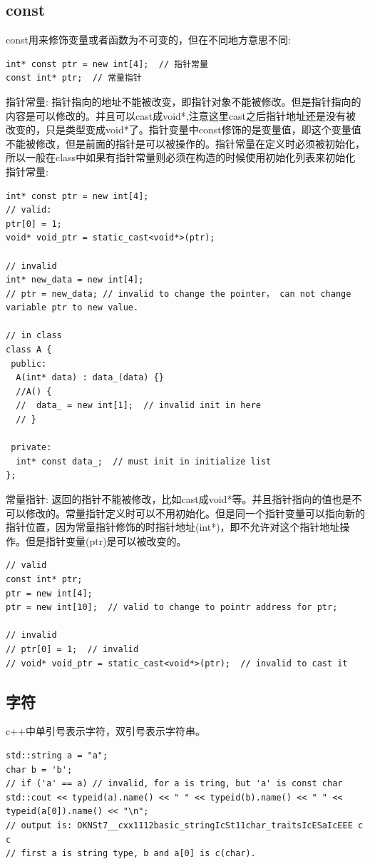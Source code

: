\documentclass[12pt]{book}
\begin{document}
\subsection{const}
const用来修饰变量或者函数为不可变的，但在不同地方意思不同:
\begin{lstlisting}
int* const ptr = new int[4];  // 指针常量
const int* ptr;  // 常量指针
\end{lstlisting}
指针常量: 指针指向的地址不能被改变，即指针对象不能被修改。但是指针指向的内容是可以修改的。并且可以cast成void*,注意这里cast之后指针地址还是没有被改变的，只是类型变成void*了。指针变量中const修饰的是变量值，即这个变量值不能被修改，但是前面的指针是可以被操作的。指针常量在定义时必须被初始化，所以一般在class中如果有指针常量则必须在构造的时候使用初始化列表来初始化指针常量:
\begin{lstlisting}
int* const ptr = new int[4];
// valid:
ptr[0] = 1;
void* void_ptr = static_cast<void*>(ptr);

// invalid
int* new_data = new int[4];
// ptr = new_data; // invalid to change the pointer， can not change variable ptr to new value.

// in class
class A {
 public:
  A(int* data) : data_(data) {}
  //A() {
  //  data_ = new int[1];  // invalid init in here
  // }
	
 private:
  int* const data_;  // must init in initialize list 
};
\end{lstlisting}
常量指针: 返回的指针不能被修改，比如cast成void*等。并且指针指向的值也是不可以修改的。常量指针定义时可以不用初始化。但是同一个指针变量可以指向新的指针位置，因为常量指针修饰的时指针地址(int*)，即不允许对这个指针地址操作。但是指针变量(ptr)是可以被改变的。
\begin{lstlisting}
// valid
const int* ptr;
ptr = new int[4];
ptr = new int[10];  // valid to change to pointr address for ptr;

// invalid
// ptr[0] = 1;  // invalid
// void* void_ptr = static_cast<void*>(ptr);  // invalid to cast it
\end{lstlisting}

\subsection{字符}
c++中单引号表示字符，双引号表示字符串。

\begin{lstlisting}
std::string a = "a";
char b = 'b';
// if ('a' == a) // invalid, for a is tring, but 'a' is const char
std::cout << typeid(a).name() << " " << typeid(b).name() << " " << typeid(a[0]).name() << "\n";
// output is: OKNSt7__cxx1112basic_stringIcSt11char_traitsIcESaIcEEE c c
// first a is string type, b and a[0] is c(char).
\end{lstlisting}
	
\end{document}
